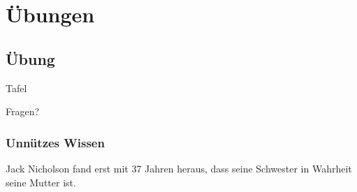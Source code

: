 \documentclass{beamer}
\begin{document}
\section{Übungen}
\subsection{Übung}
\begin{frame}
	\begin{center}
		Tafel
	\end{center}
\end{frame}

\begin{frame}
	\begin{center}
		Fragen?
	\end{center}
\end{frame}

\begin{frame}
	\frametitle{Unnützes Wissen}
	\begin{center}
		Jack Nicholson fand erst mit 37 Jahren heraus, dass seine 				Schwester in Wahrheit seine Mutter ist.
	\end{center}
\end{frame}
\end{document}
